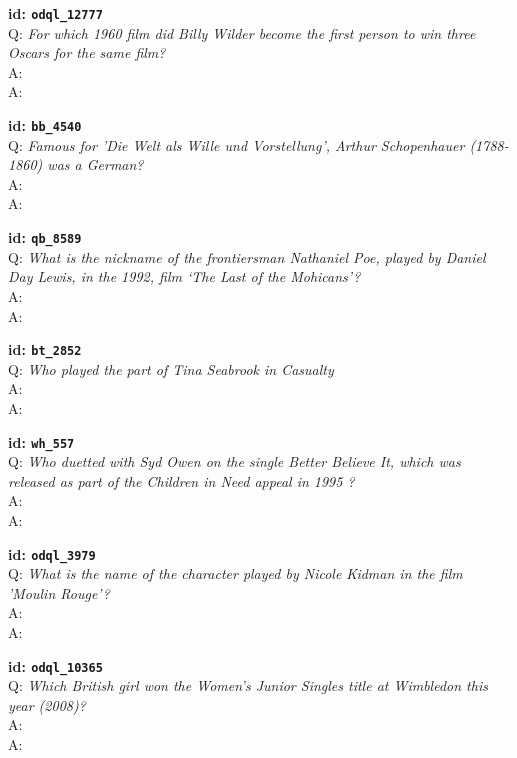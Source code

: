 \tiny{\setlength{\parindent}{0cm}
\textbf{id: \texttt{odql\_12777}} \\
Q: \textit{For which 1960 film did Billy Wilder become the first person to win three Oscars for the same film?} \\
A:  \\
A: }

\tiny{\setlength{\parindent}{0cm}
\textbf{id: \texttt{bb\_4540}} \\
Q: \textit{Famous for 'Die Welt als Wille und Vorstellung', Arthur Schopenhauer (1788-1860) was a German?} \\
A:  \\
A: }

\tiny{\setlength{\parindent}{0cm}
\textbf{id: \texttt{qb\_8589}} \\
Q: \textit{What is the nickname of the frontiersman Nathaniel Poe, played by Daniel Day Lewis, in the 1992, film ‘The Last of the Mohicans’?} \\
A:  \\
A: }

\tiny{\setlength{\parindent}{0cm}
\textbf{id: \texttt{bt\_2852}} \\
Q: \textit{Who played the part of Tina Seabrook in Casualty} \\
A:  \\
A: }

\tiny{\setlength{\parindent}{0cm}
\textbf{id: \texttt{wh\_557}} \\
Q: \textit{Who duetted with Syd Owen on the single Better Believe It, which was released as part of the Children in Need appeal in 1995 ?} \\
A:  \\
A: }

\tiny{\setlength{\parindent}{0cm}
\textbf{id: \texttt{odql\_3979}} \\
Q: \textit{What is the name of the character played by Nicole Kidman in the film 'Moulin Rouge'?} \\
A:  \\
A: }

\tiny{\setlength{\parindent}{0cm}
\textbf{id: \texttt{odql\_10365}} \\
Q: \textit{Which British girl won the Women's Junior Singles title at Wimbledon this year (2008)?} \\
A:  \\
A: }

